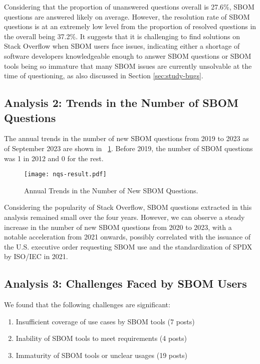 \documentclass[conference]{IEEEtran}
\begin{document}
Considering that the proportion of unanswered questions overall is 27.6\%, SBOM questions are answered likely on average. However, the resolution rate of SBOM questions is at an extremely low level from the proportion of resolved questions in the overall being 37.2\%. It suggests that it is challenging to find solutions on Stack Overflow when SBOM users face issues, indicating either a shortage of software developers knowledgeable enough to answer SBOM questions or SBOM tools being so immature that many SBOM issues are currently unsolvable at the time of questioning, as also discussed in Section \ref{sec:study-bugs}.

\subsection{Analysis 2: Trends in the Number of SBOM Questions}
The annual trends in the number of new SBOM questions from 2019 to 2023 as of September 2023 are shown in \figurename~\ref{fig:num-questions-result}. Before 2019, the number of SBOM questions was 1 in 2012 and 0 for the rest.

\begin{figure}[!t]
  \centering
  \texttt{[image: nqs-result.pdf]}
  \caption{Annual Trends in the Number of New SBOM Questions.}
  \label{fig:num-questions-result}
\end{figure}

Considering the popularity of Stack Overflow, SBOM questions extracted in this analysis remained small over the four years. However, we can observe a steady increase in the number of new SBOM questions from 2020 to 2023, with a notable acceleration from 2021 onwards, possibly correlated with the issuance of the U.S. executive order requesting SBOM use and the standardization of SPDX by ISO/IEC in 2021.

\subsection{Analysis 3: Challenges Faced by SBOM Users}
We found that the following challenges are significant:

\begin{enumerate}
  \item Insufficient coverage of use cases by SBOM tools (7 posts)  %
  \item Inability of SBOM tools to meet requirements (4 posts)  %
  \item Immaturity of SBOM tools or unclear usages (19 posts)  %
\end{enumerate}
\end{document}
